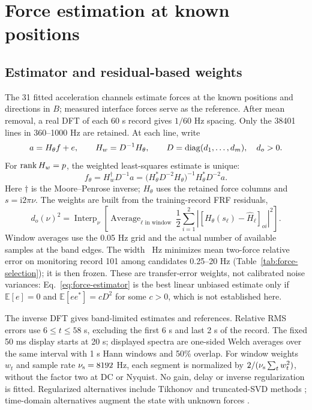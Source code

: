 \section{Force estimation at known positions}\label{sec:forces}
\subsection{Estimator and residual-based weights}
The 31 fitted acceleration channels estimate forces at the known positions
and directions in $B$; measured interface forces serve as the reference.
After mean removal, a real DFT of each 60 s record gives $1/60$ Hz spacing.
Only the 38401 lines in 360--1000 Hz are retained. At each line, write
\[
 a=H_\theta f+e,\qquad H_w=D^{-1}H_\theta,\qquad
 D=\operatorname{diag}(d_1,\ldots,d_m),\quad d_o>0.
\]
For $\operatorname{rank} H_w=p$, the weighted least-squares estimate is unique:
\begin{equation}
 f_\theta=H_w^\dagger D^{-1}a
 =\bigl(H_\theta^*D^{-2}H_\theta\bigr)^{-1}H_\theta^*D^{-2}a.
 \label{eq:force-estimator}
\end{equation}
Here $\dagger$ is the Moore--Penrose inverse; $H_\theta$ uses the retained
force columns and $s=\mathrm i2\pi\nu$. The weights are built from the
training-record FRF residuals,
\[
 d_o(\nu)^2=\operatorname{Interp}_\nu\left[
 \operatorname{Average}_{\ell\text{ in window}}\,
 \frac12\sum_{i=1}^{2}|[H_\theta(s_\ell)-\widehat H_\ell]_{oi}|^2\right].
\]
Window averages use the 0.05 Hz grid and the actual number of available
samples at the band edges. The width \ForceWindow\ Hz minimizes mean
two-force relative error on monitoring record 101 among candidates
0.25--20 Hz (Table~\ref{tab:force-selection}); it is then frozen.
These are transfer-error weights, not calibrated noise variances:
Eq.~\eqref{eq:force-estimator} is the best linear unbiased estimate only if
$\mathbb E[e]=0$ and $\mathbb E[ee^*]=cD^2$ for some $c>0$, which is not
established here.

The inverse DFT gives band-limited estimates and references. Relative RMS
errors use $6\le t\le58$ s, excluding the first 6 s and last 2 s of the
record. The fixed 50 ms display starts at 20 s; displayed spectra are
one-sided Welch averages \citep{welch1967} over the same interval with 1 s
Hann windows and 50\% overlap. For window weights $w_t$ and sample rate
$\nu_{\rm s}=8192$ Hz, each segment is normalized by
$2/(\nu_{\rm s}\sum_tw_t^{2})$, without the factor two at DC or Nyquist. No gain, delay or inverse regularization is fitted. Regularized alternatives include Tikhonov and
truncated-SVD methods
\citep{tikhonov1977,hansen1992,hansen1998,jacquelin2003,thite2003,sanchez2014};
time-domain alternatives augment the state with unknown forces
\citep{lourens2012,lourens2012b,maes2015}.

